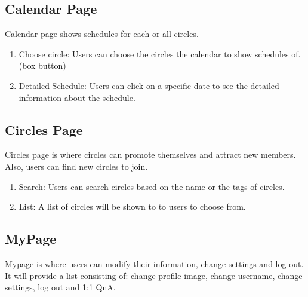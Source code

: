\documentclass[conference]{IEEEtran}
\begin{document}
\subsection{Calendar Page}
Calendar page shows schedules for each or all circles.
    \begin{enumerate}
        \item Choose circle: Users can choose the circles the calendar to show schedules of. (box button)
        \item Detailed Schedule: Users can click on a specific date to see the detailed information about the schedule.
    \end{enumerate}
\subsection{Circles Page}
Circles page is where circles can promote themselves and attract new members. Also, users can find new circles to join.
\begin{enumerate}
    \item Search: Users can search circles based on the name or the tags of circles. 
    \item List: A list of circles will be shown to to users to choose from.
\end{enumerate}
\subsection{MyPage}
Mypage is where users can modify their information, change settings and log out. It will provide a list consisting of: change profile image, change username, change settings, log out and 1:1 QnA.
\end{document}
